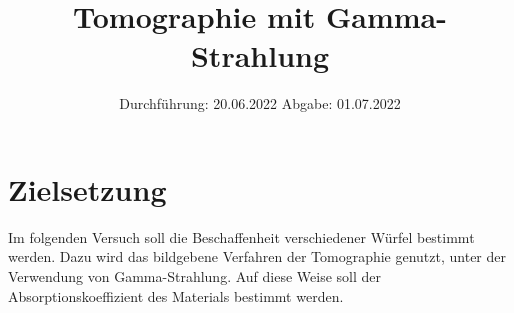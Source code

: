 

\subject{V14}
\title{Tomographie mit Gamma-Strahlung}
\date{
    Durchführung: 20.06.2022
     \hspace{3em}
    Abgabe: 01.07.2022
}


\maketitle
\thispagestyle{empty}
\tableofcontents
\newpage

\section{Zielsetzung}

    Im folgenden Versuch soll die Beschaffenheit verschiedener Würfel bestimmt werden.
    Dazu wird das bildgebene Verfahren der Tomographie genutzt,
    unter der Verwendung von Gamma-Strahlung.
    Auf diese Weise soll der Absorptionskoeffizient des Materials bestimmt werden.


\clearpage


\clearpage


\clearpage


\clearpage

\printbibliography


